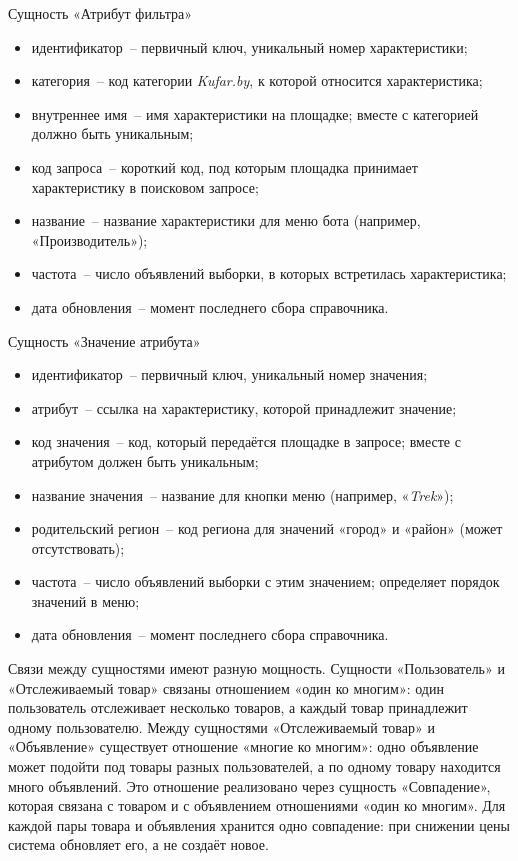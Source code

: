 Сущность «Атрибут фильтра»
\begin{itemize}
	\item идентификатор~-- первичный ключ, уникальный номер характеристики;
	\item категория~-- код категории \textit{Kufar.by}, к которой относится характеристика;
	\item внутреннее имя~-- имя характеристики на площадке; вместе с категорией должно быть уникальным;
	\item код запроса~-- короткий код, под которым площадка принимает характеристику в поисковом запросе;
	\item название~-- название характеристики для меню бота (например, «Производитель»);
	\item частота~-- число объявлений выборки, в которых встретилась характеристика;
	\item дата обновления~-- момент последнего сбора справочника.
\end{itemize}

Сущность «Значение атрибута»
\begin{itemize}
	\item идентификатор~-- первичный ключ, уникальный номер значения;
	\item атрибут~-- ссылка на характеристику, которой принадлежит значение;
	\item код значения~-- код, который передаётся площадке в запросе; вместе с атрибутом должен быть уникальным;
	\item название значения~-- название для кнопки меню (например, «\textit{Trek}»);
	\item родительский регион~-- код региона для значений «город» и «район» (может отсутствовать);
	\item частота~-- число объявлений выборки с этим значением; определяет порядок значений в меню;
	\item дата обновления~-- момент последнего сбора справочника.
\end{itemize}

Связи между сущностями имеют разную мощность. Сущности «Пользователь» и «Отслеживаемый товар» связаны отношением «один ко многим»: один пользователь отслеживает несколько товаров, а каждый товар принадлежит одному пользователю. Между сущностями «Отслеживаемый товар» и «Объявление» существует отношение «многие ко многим»: одно объявление может подойти под товары разных пользователей, а по одному товару находится много объявлений. Это отношение реализовано через сущность «Совпадение», которая связана с товаром и с объявлением отношениями «один ко многим». Для каждой пары товара и объявления хранится одно совпадение: при снижении цены система обновляет его, а не создаёт новое.

